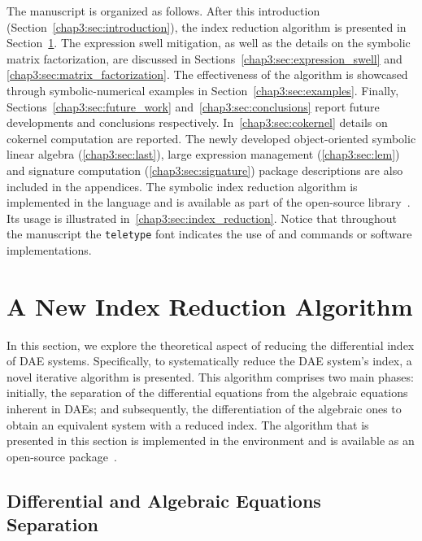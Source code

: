 The manuscript is organized as follows. After this introduction (Section~\ref{chap3:sec:introduction}), the index reduction algorithm is presented in Section~\ref{chap3:sec:algorithm}. The expression swell mitigation, as well as the details on the symbolic matrix factorization, are discussed in Sections~\ref{chap3:sec:expression_swell} and \ref{chap3:sec:matrix_factorization}. The effectiveness of the algorithm is showcased through symbolic-numerical examples in Section~\ref{chap3:sec:examples}. Finally, Sections~\ref{chap3:sec:future_work} and~\ref{chap3:sec:conclusions} report future developments and conclusions respectively. In~\ref{chap3:sec:cokernel} details on cokernel computation are reported. The newly developed object-oriented symbolic linear algebra (\ref{chap3:sec:last}), large expression management (\ref{chap3:sec:lem}) and signature computation (\ref{chap3:sec:signature}) package descriptions are also included in the appendices. The symbolic index reduction algorithm is implemented in the \Maple{} language and is available as part of the open-source \Indigo{} library~\cite{indigo}. Its usage is illustrated in~\ref{chap3:sec:index_reduction}. Notice that throughout the manuscript the \texttt{teletype} font indicates the use of \Maple{} and \Matlab{} commands or software implementations.


\section{A New Index Reduction Algorithm}
\label{chap3:sec:algorithm}

In this section, we explore the theoretical aspect of reducing the differential index of \ac{DAE} systems. Specifically, to systematically reduce the \ac{DAE} system's index, a novel iterative algorithm is presented. This algorithm comprises two main phases: initially, the separation of the differential equations from the algebraic equations inherent in \acp{DAE}; and subsequently, the differentiation of the algebraic ones to obtain an equivalent system with a reduced index. The algorithm that is presented in this section is implemented in the \Maple{} environment and is available as an open-source package~\cite{indigo}.

\subsection{Differential and Algebraic Equations Separation}
\label{chap3:sec:separation}

